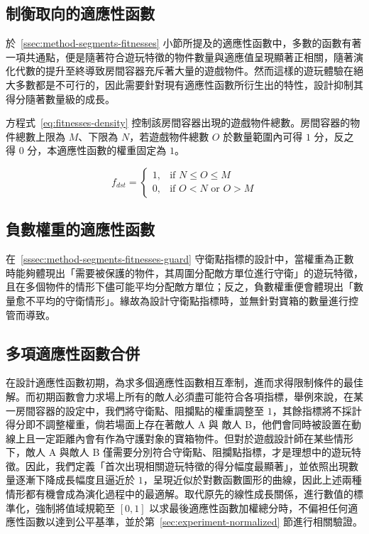 \subsection{制衡取向的適應性函數}
\label{ssec:method-segments-balancefitness}

於~\ref{ssec:method-segments-fitnesses} 小節所提及的適應性函數中，多數的函數有著一項共通點，便是隨著符合遊玩特徵的物件數量與適應值呈現顯著正相關，隨著演化代數的提升至終導致房間容器充斥著大量的遊戲物件。然而這樣的遊玩體驗在絕大多數都是不可行的，因此需要針對現有適應性函數所衍生出的特性，設計抑制其得分隨著數量級的成長。

方程式~\ref{eq:fitnesses-density} 控制該房間容器出現的遊戲物件總數。房間容器的物件總數上限為 $M$、下限為 $N$，若遊戲物件總數 $O$ 於數量範圍內可得 $1$ 分，反之得 $0$ 分，本適應性函數的權重固定為 $1$。

\begin{equation}
    \label{eq:fitnesses-density}
    f_{dst} = \begin{cases}
                  1, & \mbox{if } N \leq O \leq M \\
                  0, & \mbox{if } O<N \text{ or } O>M
              \end{cases}
\end{equation}

\subsection{負數權重的適應性函數}
\label{ssec:method-segments-minusscores}

在~\ref{sssec:method-segments-fitnesses-guard} 守衛點指標的設計中，當權重為正數時能夠體現出「需要被保護的物件，其周圍分配敵方單位進行守衛」的遊玩特徵，且在多個物件的情形下儘可能平均分配敵方單位；反之，負數權重便會體現出「數量愈不平均的守衛情形」。緣故為設計守衛點指標時，並無針對寶箱的數量進行控管而導致。

\subsection{多項適應性函數合併}
\label{ssec:method-segments-multiobjectives}

在設計適應性函數初期，為求多個適應性函數相互牽制，進而求得限制條件的最佳解。而初期函數會力求場上所有的敵人必須盡可能符合各項指標，舉例來說，在某一房間容器的設定中，我們將守衛點、阻攔點的權重調整至 $1$，其餘指標將不採計得分即不調整權重，倘若場面上存在著敵人 A 與 敵人 B，他們會同時被設置在動線上且一定距離內會有作為守護對象的寶箱物件。但對於遊戲設計師在某些情形下，敵人 A 與敵人 B 僅需要分別符合守衛點、阻攔點指標，才是理想中的遊玩特徵。因此，我們定義「首次出現相關遊玩特徵的得分幅度最顯著」，並依照出現數量逐漸下降成長幅度且逼近於 $1$，呈現近似於對數函數圖形的曲線，因此上述兩種情形都有機會成為演化過程中的最適解。取代原先的線性成長關係，進行數值的標準化，強制將值域規範至 $[0, 1]$ 以求最後適應性函數加權總分時，不偏袒任何適應性函數以達到公平基準，並於第~\ref{sec:experiment-normalized} 節進行相關驗證。

